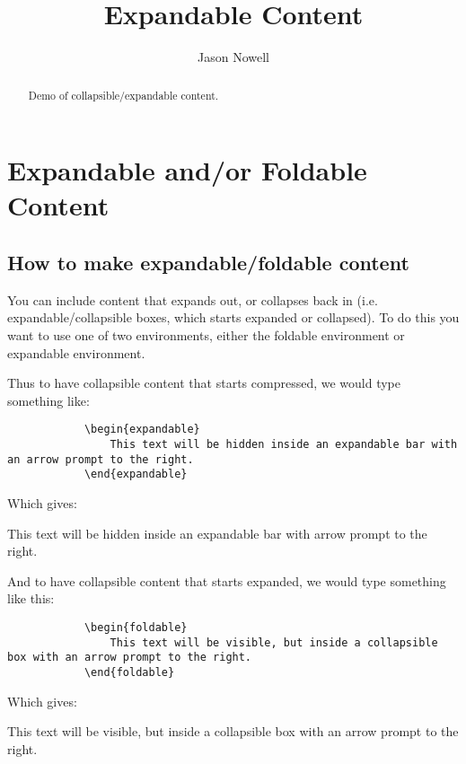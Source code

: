 \documentclass{ximera}
\title{Expandable Content}
\author{Jason Nowell}
\begin{document}
\begin{abstract}
    Demo of collapsible/expandable content.
\end{abstract}
\maketitle
\section*{Expandable and/or Foldable Content}
    \subsection*{How to make expandable/foldable content}
        You can include content that expands out, or collapses back in (i.e. expandable/collapsible boxes, which starts expanded or collapsed). To do this you want to use one of two environments, either the foldable environment or expandable environment.
        
        Thus to have collapsible content that starts compressed, we would type something like:
        \begin{verbatim}
            \begin{expandable}
                This text will be hidden inside an expandable bar with an arrow prompt to the right.
            \end{expandable}
        \end{verbatim}
        
        Which gives:
    
        \begin{expandable}
            This text will be hidden inside an expandable bar with arrow prompt to the right.
        \end{expandable}
            
        And to have collapsible content that starts expanded, we would type something like this:
    
        \begin{verbatim}
            \begin{foldable}
                This text will be visible, but inside a collapsible box with an arrow prompt to the right.
            \end{foldable}
        \end{verbatim}
    
        Which gives:
    
        \begin{foldable}
            This text will be visible, but inside a collapsible box with an arrow prompt to the right.
        \end{foldable}
    
\end{document}

